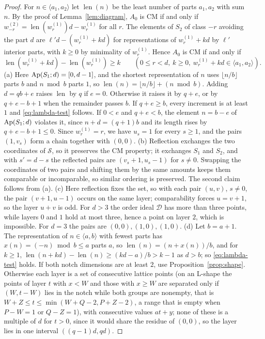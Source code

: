 \begin{proof}
For $n\in\langle a_1,a_2\rangle$ let $\operatorname{len}(n)$ be the least number of parts $a_1,a_2$ with sum $n$. By the proof of Lemma~\ref{lem:diagram}, $A_0$ is CM if and only if $w^{(2)}_{-r}=\operatorname{len}(w^{(1)}_r)d-w^{(1)}_r$ for all $r$. The elements of $S_2$ of class $-r$ avoiding the part $d$ are $\ell'd-(w^{(1)}_r+kd)$ for representations of $w^{(1)}_r+kd$ by $\ell'$ interior parts, with $k\ge0$ by minimality of $w^{(1)}_r$. Hence $A_0$ is CM if and only if
\begin{equation}\label{eq:lambda-test}
\operatorname{len}(w^{(1)}_r+kd)-\operatorname{len}(w^{(1)}_r)\ge k\qquad(0\le r<d,\ k\ge0,\ w^{(1)}_r+kd\in\langle a_1,a_2\rangle).
\end{equation}
(a) Here $\operatorname{Ap}(S_1;d)=[0,d-1]$, and the shortest representation of $n$ uses $\lfloor n/b\rfloor$ parts $b$ and $n\bmod b$ parts $1$, so $\operatorname{len}(n)=\lfloor n/b\rfloor+(n\bmod b)$. Adding $d=qb+e$ raises $\operatorname{len}$ by $q$ if $e=0$. Otherwise it raises it by $q+e$, or by $q+e-b+1$ when the remainder passes $b$. If $q+e\ge b$, every increment is at least $1$ and \eqref{eq:lambda-test} follows. If $0<e$ and $q+e<b$, the element $n=b-e$ of $\operatorname{Ap}(S_1;d)$ violates it, since $n+d=(q+1)b$ and its length rises by $q+e-b+1\le0$. Since $w^{(1)}_r=r$, we have $u_s=1$ for every $s\ge1$, and the pairs $(1,v_s)$ form a chain together with $(0,0)$.
(b) Reflection exchanges the two coordinates of $\mathcal S$, so it preserves the CM property; it exchanges $S_1$ and $S_2$, and with $s'=d-s$ the reflected pairs are $(v_s+1,u_s-1)$ for $s\ne0$. Swapping the coordinates of two pairs and shifting them by the same amounts keeps them comparable or incomparable, so similar ordering is preserved. The second claim follows from (a).
(c) Here reflection fixes the set, so with each pair $(u,v)$, $s\ne0$, the pair $(v+1,u-1)$ occurs on the same layer; comparability forces $u=v+1$, so the layer $u+v$ is odd. For $d>3$ the order ideal $\mathcal D$ has more than three points, while layers $0$ and $1$ hold at most three, hence a point on layer $2$, which is impossible. For $d=3$ the pairs are $(0,0),(1,0),(1,0)$.
(d) Let $b=a+1$. The representation of $n\in\langle a,b\rangle$ with fewest parts has $x(n)=(-n)\bmod b\le a$ parts $a$, so $\operatorname{len}(n)=(n+x(n))/b$, and for $k\ge1$, $\operatorname{len}(n+kd)-\operatorname{len}(n)\ge(kd-a)/b>k-1$ as $d>b$; so \eqref{eq:lambda-test} holds. If both notch dimensions are at least $2$, use Proposition~\ref{prop:shape}. Otherwise each layer is a set of consecutive lattice points (on an L-shape the points of layer $t$ with $x<W$ and those with $x\ge W$ are separated only if $(W,t-W)$ lies in the notch while both groups are nonempty, that is $W+Z\le t\le\min(W+Q-2,P+Z-2)$, a range that is empty when $P-W=1$ or $Q-Z=1$), with consecutive values $at+y$; none of these is a multiple of $d$ for $t>0$, since it would share the residue of $(0,0)$, so the layer lies in one interval $((q-1)d,qd)$.
\end{proof}

